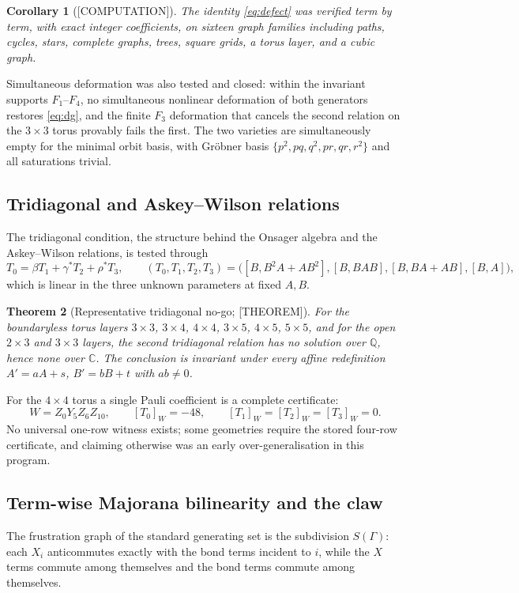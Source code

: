 \documentclass[11pt]{article}
\newtheorem{theorem}{Theorem}[section]
\newtheorem{corollary}[theorem]{Corollary}
\theoremstyle{definition}
\newcommand{\Qb}{\mathbb{Q}}
\newcommand{\Cb}{\mathbb{C}}
\begin{document}
\begin{corollary}[{[COMPUTATION]}]
The identity \eqref{eq:defect} was verified term by term, with exact integer coefficients, on sixteen
graph families including paths, cycles, stars, complete graphs, trees, square grids, a torus layer,
and a cubic graph.
\end{corollary}

Simultaneous deformation was also tested and closed: within the invariant supports $F_1$--$F_4$,
no simultaneous nonlinear deformation of both generators restores \eqref{eq:dg}, and the finite $F_3$
deformation that cancels the second relation on the $3\times3$ torus provably fails the first. The
two varieties are simultaneously empty for the minimal orbit basis, with Gr\"obner basis
$\{p^2,pq,q^2,pr,qr,r^2\}$ and all saturations trivial.

\subsection{Tridiagonal and Askey--Wilson relations}\label{sec:td}
The tridiagonal condition, the structure behind the Onsager algebra and the Askey--Wilson
relations, is tested through
\[
T_0=\beta T_1+\gamma^*T_2+\rho^*T_3,\qquad
(T_0,T_1,T_2,T_3)=\bigl([B,B^2A+AB^2],[B,BAB],[B,BA+AB],[B,A]\bigr),
\]
which is linear in the three unknown parameters at fixed $A,B$.

\begin{theorem}[Representative tridiagonal no-go; {[THEOREM]}]\label{thm:td}
For the boundaryless torus layers $3\times3$, $3\times4$, $4\times4$, $3\times5$, $4\times5$,
$5\times5$, and for the open $2\times3$ and $3\times3$ layers, the second tridiagonal relation has no
solution over $\Qb$, hence none over $\Cb$. The conclusion is invariant under every affine
redefinition $A'=aA+s$, $B'=bB+t$ with $ab\ne0$.
\end{theorem}

For the $4\times4$ torus a single Pauli coefficient is a complete certificate:
\[
W=Z_0Y_5Z_6Z_{10},\qquad [T_0]_W=-48,\qquad [T_1]_W=[T_2]_W=[T_3]_W=0 .
\]
No universal one-row witness exists; some geometries require the stored four-row certificate, and
claiming otherwise was an early over-generalisation in this program.

\subsection{Term-wise Majorana bilinearity and the claw}\label{sec:claw}
The frustration graph of the standard generating set is the subdivision $S(\Gamma)$: each $X_i$
anticommutes exactly with the bond terms incident to $i$, while the $X$ terms commute among
themselves and the bond terms commute among themselves.
\end{document}
